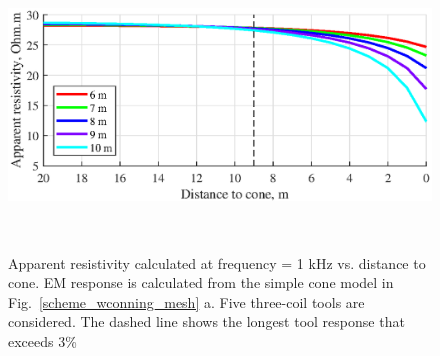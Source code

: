 \documentclass{eage19}
\begin{document}
\begin{figure}[h!]

		\centering
		\includegraphics[clip,width=0.85\linewidth]{phase_diff.eps}

	\caption{Apparent resistivity calculated at frequency = 1 kHz vs. distance to cone. EM response is calculated from the simple cone model in Fig.~\ref{scheme_wconning_mesh} a. Five three-coil tools are considered. The dashed line shows the longest tool response that exceeds 3\%}
	\label{signals1}\
	
\end{figure}
\end{document}
